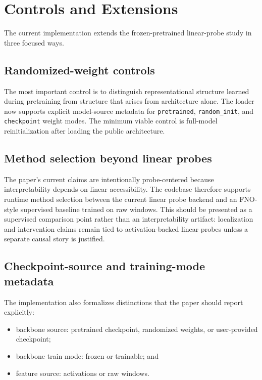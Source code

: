 \documentclass{article}
\begin{document}
\section{Controls and Extensions}
\label{sec:plan}

The current implementation extends the frozen-pretrained linear-probe study in three focused ways.

\subsection{Randomized-weight controls}

The most important control is to distinguish representational structure learned during pretraining from structure that arises from architecture alone. The loader now supports explicit model-source metadata for \texttt{pretrained}, \texttt{random\_init}, and \texttt{checkpoint} weight modes. The minimum viable control is full-model reinitialization after loading the public architecture.

\subsection{Method selection beyond linear probes}

The paper's current claims are intentionally probe-centered because interpretability depends on linear accessibility. The codebase therefore supports runtime method selection between the current linear probe backend and an FNO-style supervised baseline trained on raw windows. This should be presented as a supervised comparison point rather than an interpretability artifact: localization and intervention claims remain tied to activation-backed linear probes unless a separate causal story is justified.

\subsection{Checkpoint-source and training-mode metadata}

The implementation also formalizes distinctions that the paper should report explicitly:
\begin{itemize}[leftmargin=18pt]
\item backbone source: pretrained checkpoint, randomized weights, or user-provided checkpoint;
\item backbone train mode: frozen or trainable; and
\item feature source: activations or raw windows.
\end{itemize}
\end{document}
